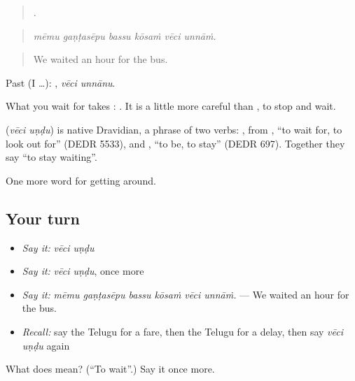 \begin{quote}
     .
\end{quote}

\begin{quote}
\emph{mēmu gaṇṭasēpu bassu kōsaṁ vēci unnāṁ.}
\end{quote}

\begin{quote}
We waited an hour for the bus.
\end{quote}

Past (I …):  , \emph{vēci unnānu}.

What you wait for takes :    . It is a little more careful than , to stop and wait.

\begin{cousinweb}
\textbf{ } (\emph{vēci uṇḍu}) is native Dravidian, a phrase of two verbs: , from , \textquotedblleft{}to wait for, to look out for\textquotedblright{} (DEDR 5533), and , \textquotedblleft{}to be, to stay\textquotedblright{} (DEDR 697). Together they say \textquotedblleft{}to stay waiting\textquotedblright{}.
\end{cousinweb}

\begin{grammarlens}[title={What you've built}]
One more word for getting around.
\end{grammarlens}

\subsection*{Your turn}
\begin{itemize}
\raggedright
  \item \emph{Say it:} \emph{vēci uṇḍu}
  \item \emph{Say it:} \emph{vēci uṇḍu}, once more
  \item \emph{Say it:} \emph{mēmu gaṇṭasēpu bassu kōsaṁ vēci unnāṁ.} — We waited an hour for the bus.
  \item \emph{Recall:} say the Telugu for a fare, then the Telugu for a delay, then say \emph{vēci uṇḍu} again
\end{itemize}

\begin{tcolorbox}[breakable,colback=teal!4,colframe=teal!35!black,title={Before you move on}]
What does   mean? (\textquotedblleft{}To wait\textquotedblright{}.) Say it once more.
\end{tcolorbox}
